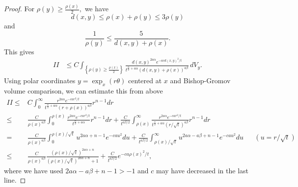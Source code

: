 \documentclass[10pt,a4paper]{amsart}
\begin{document}
\begin{proof}
    For $\rho(y) \geq \frac{\rho(x)}{2},$ we have
    $$d(x,y) \leq \rho(x) + \rho(y) \leq 3 \rho(y)$$
    and
    $$ \frac{1}{\rho(y)}\leq \frac{5}{d(x,y) + \rho(x)}.$$
    This gives
    \begin{equation*}
    \begin{split}
    II & \leq C\int_{\left\{ \rho(y) \geq \frac{\rho(x)}{2} \right\} } \frac{d(x,y)^{2a\alpha} e^{-a c d(x,y)^2/t} }{t^{\frac{n}{2} + a\alpha } \left( d(x,y) + \rho(x) \right)^{a\beta} } \, dV_y.
    \end{split}
    \end{equation*}
    Using polar coordinates $y = \exp_x(r \theta) $ centered at $x$ and Bishop-Gromov volume comparison, we can estimate this from above
    \begin{align*}
        II \le{}& C \int_0^\infty \frac{r^{2 a \alpha} e^{-ca r^2/t}}{t^{\frac n2 + a \alpha} ( r + \rho(x))^{a \beta}} r^{n-1} dr 
        \\
        \le{}& \frac C{\rho(x)^{a\beta}} \int_0^{\rho(x)} \frac{r^{2 a \alpha} e^{-ca r^2/t}}{t^{\frac n2 + a \alpha} } r^{n-1} dr 
        + \frac C{t^{a \beta/2}} \int_{\rho(x)}^\infty \frac{r^{2 a \alpha} e^{-ca r^2/t}}{t^{\frac n2 + a \alpha} ( r /\sqrt t)^{a \beta}} r^{n-1} dr \\
        ={}& \frac C{\rho(x)^{a\beta}} \int_0^{\rho(x)/\sqrt{t}} u^{2 a \alpha + n-1} e^{-ca u^2} du 
        + \frac C{t^{a \beta/2}} \int_{\rho(x)/\sqrt t}^\infty u^{2 a \alpha - a \beta + n-1} e^{- ca u^2 } du
        && ( u = r/ \sqrt t) \\
        \le{}& \frac C{\rho(x)^{a \beta}} \frac{(\rho(x)/\sqrt t)^{2 a \alpha + n}}{ (\rho(x)/\sqrt t)^{2 a \alpha + n} + 1  }
        + \frac C{t^{a \beta/2}} e^{- c a \rho(x)^2 / t} ,
    \end{align*}
    where we have used $2 a \alpha - a \beta + n - 1 > -1$ and $c$ may have decreased in the last line.


\end{proof}
\end{document}

